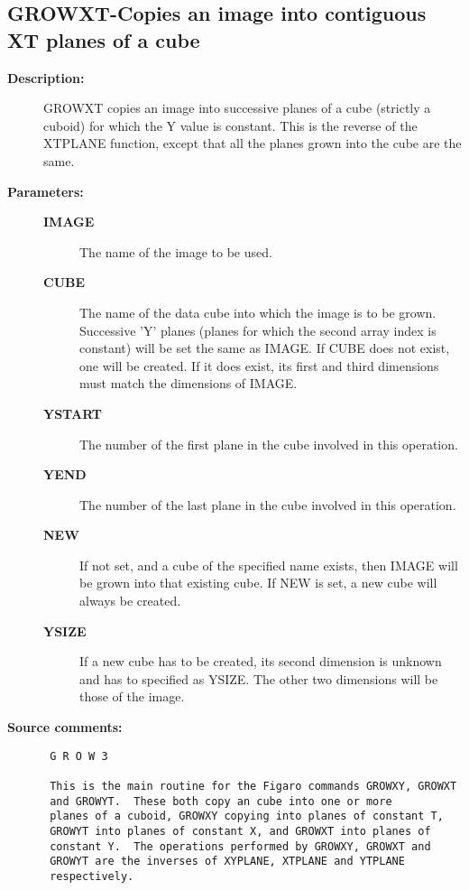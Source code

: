 \subsection{GROWXT-\label{GROWXT}Copies an image into contiguous XT planes of a cube}
\begin{description}

\item [{\bf Description:}]
 GROWXT copies an image into successive planes of a cube (strictly
 a cuboid) for which the Y value is constant.  This is the reverse
 of the XTPLANE function, except that all the planes grown into the
 cube are the same.

\item [{\bf Parameters:}]
\begin{description}
\item [{\bf IMAGE}]
 The name of the image to be used.
\item [{\bf CUBE}]
 The name of the data cube into which the image
 is to be grown.  Successive 'Y' planes (planes for which
 the second array index is constant) will be set the same
 as IMAGE.  If CUBE does not exist, one will be created.
 If it does exist, its first and third dimensions must
 match the dimensions of IMAGE.
\item [{\bf YSTART}]
 The number of the first plane in the cube
 involved in this operation.
\item [{\bf YEND}]
 The number of the last plane in the cube
 involved in this operation.
\item [{\bf NEW}]
 If not set, and a cube of the specified name exists,
 then IMAGE will be grown into that existing cube.
 If NEW is set, a new cube will always be created.
\item [{\bf YSIZE}]
 If a new cube has to be created, its second dimension
 is unknown and has to specified as YSIZE.  The other
 two dimensions will be those of the image.
\end{description}

\item [{\bf Source comments:}]
\begin{verbatim}
 G R O W 3

 This is the main routine for the Figaro commands GROWXY, GROWXT
 and GROWYT.  These both copy an cube into one or more
 planes of a cuboid, GROWXY copying into planes of constant T,
 GROWYT into planes of constant X, and GROWXT into planes of
 constant Y.  The operations performed by GROWXY, GROWXT and
 GROWYT are the inverses of XYPLANE, XTPLANE and YTPLANE
 respectively.


\end{verbatim}
\end{description}
